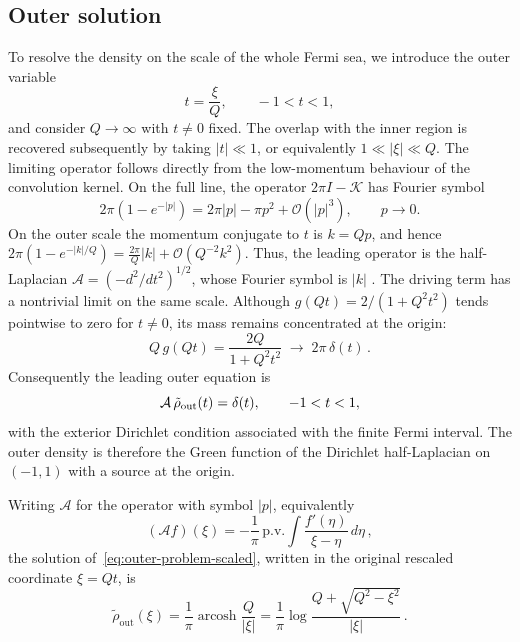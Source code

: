 \documentclass[11pt,a4paper]{article}
\theoremstyle{definition}
\begin{document}
\subsection{Outer solution}
To resolve the density on the scale of the whole Fermi sea, we introduce the
outer variable
\begin{equation}
    t=\frac{\xi}{Q},\qquad -1<t<1,
\end{equation}
and consider $Q\to\infty$ with $t\neq0$ fixed.  The overlap with the inner
region is recovered subsequently by taking $|t|\ll 1$, or equivalently
$1\ll|\xi|\ll Q$.
The limiting operator follows directly from the low-momentum behaviour of the
convolution kernel.  On the full line, the operator $2\pi I-\mathcal K$ has
Fourier symbol
\begin{equation}\label{eq:outer-symbol}
2\pi\left(1-e^{-|p|}\right)
=2\pi|p|-\pi p^2+\mathcal O(|p|^3),
\qquad p\to0.
\end{equation}
On the outer scale the momentum conjugate to $t$ is $k=Qp$, and hence
$  2\pi\left(1-e^{-|k|/Q}\right)
  =\frac{2\pi}{Q}|k|+\mathcal O \left(Q^{-2}k^2\right)$.
Thus, the leading operator is the  half-Laplacian $\mathcal A=(-d^2/dt^2)^{1/2}$,
whose Fourier symbol is $|k|$ .
The driving term has a nontrivial limit on the same scale.  Although
$g(Qt)=2/(1+Q^2t^2)$ tends pointwise to zero for $t\neq0$, its mass remains
concentrated at the origin:
\begin{equation}
      Q\,g(Qt)
  =\frac{2Q}{1+Q^2t^2}
  \;\longrightarrow\;
  2\pi\,\delta(t) \, .
\end{equation}
Consequently the leading outer equation is
\begin{equation}\label{eq:outer-problem-scaled}
\mathcal A \, \tilde\rho_{\rm out}(t)=\delta(t),
\qquad -1<t<1,
\end{equation}
with the exterior Dirichlet condition associated with the finite Fermi
interval.  The outer density is therefore the Green function of the
Dirichlet half-Laplacian on $(-1,1)$ with a source at the origin.

Writing $\mathcal{A}$ for the operator with symbol $|p|$, equivalently
\begin{equation}\label{eq.A-operator}
  (\mathcal{A}f)(\xi)
  = -\frac{1}{\pi}\,\mathrm{p.v.}\int \frac{f'(\eta)}{\xi-\eta}\,d\eta\,,
\end{equation}
the solution of~\eqref{eq:outer-problem-scaled}, written in the original
rescaled coordinate $\xi=Qt$, is
\begin{equation}\label{eq.outer-solution}
  \tilde\rho_{\mathrm{out}}(\xi)
  = \frac{1}{\pi}\operatorname{arcosh}\frac{Q}{|\xi|}
  = \frac{1}{\pi}\log\frac{Q + \sqrt{Q^2-\xi^2}}{|\xi|}\,.
\end{equation}
\end{document}
